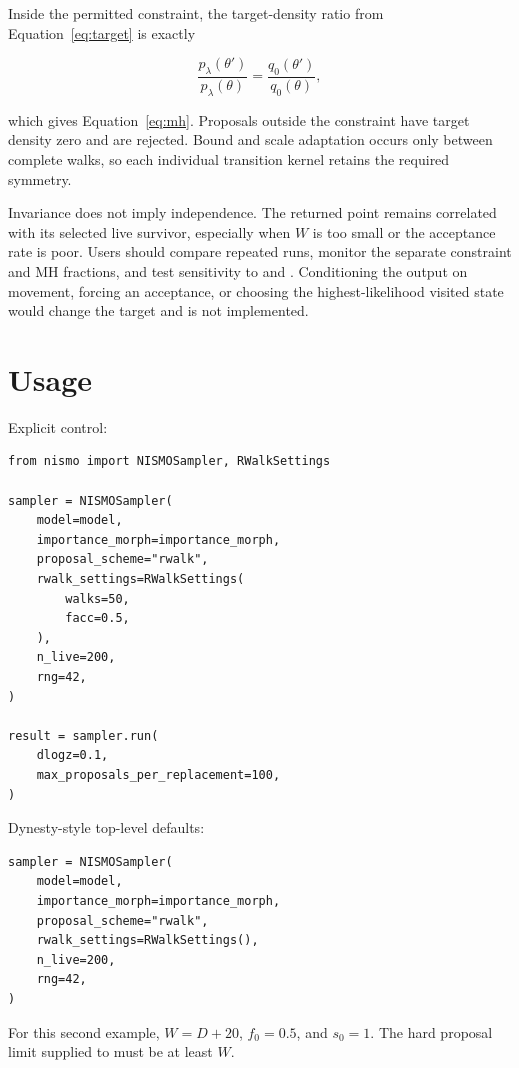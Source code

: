 \documentclass[11pt,a4paper]{article}
\newcommand{\code}[1]{\texttt{\detokenize{#1}}}
\begin{document}
Inside the permitted constraint, the target-density ratio from
Equation~\eqref{eq:target} is exactly

\begin{equation}
  \frac{p_\lambda(\theta')}{p_\lambda(\theta)}
  =\frac{q_0(\theta')}{q_0(\theta)},
\end{equation}

which gives Equation~\eqref{eq:mh}.  Proposals outside the constraint have
target density zero and are rejected.  Bound and scale adaptation occurs only
between complete walks, so each individual transition kernel retains the
required symmetry.

Invariance does not imply independence.  The returned point remains
correlated with its selected live survivor, especially when \(W\) is too
small or the acceptance rate is poor.  Users should compare repeated runs,
monitor the separate constraint and MH fractions, and test sensitivity to
\code{walks} and \code{n_live}.  Conditioning the output on movement, forcing
an acceptance, or choosing the highest-likelihood visited state would change
the target and is not implemented.

\section{Usage}

Explicit control:

\begin{lstlisting}
from nismo import NISMOSampler, RWalkSettings

sampler = NISMOSampler(
    model=model,
    importance_morph=importance_morph,
    proposal_scheme="rwalk",
    rwalk_settings=RWalkSettings(
        walks=50,
        facc=0.5,
    ),
    n_live=200,
    rng=42,
)

result = sampler.run(
    dlogz=0.1,
    max_proposals_per_replacement=100,
)
\end{lstlisting}

Dynesty-style top-level defaults:

\begin{lstlisting}
sampler = NISMOSampler(
    model=model,
    importance_morph=importance_morph,
    proposal_scheme="rwalk",
    rwalk_settings=RWalkSettings(),
    n_live=200,
    rng=42,
)
\end{lstlisting}

For this second example, \(W=D+20\), \(f_0=0.5\), and \(s_0=1\).  The hard
proposal limit supplied to \code{run()} must be at least \(W\).
\end{document}
